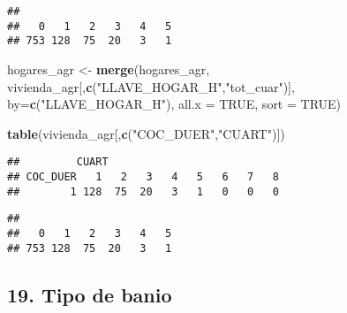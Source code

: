 \documentclass[11pt,]{article}
\newenvironment{Shaded}{\begin{snugshade}}{\end{snugshade}}
\newcommand{\KeywordTok}[1]{\textcolor[rgb]{0.13,0.29,0.53}{\textbf{#1}}}
\newcommand{\DataTypeTok}[1]{\textcolor[rgb]{0.13,0.29,0.53}{#1}}
\newcommand{\DecValTok}[1]{\textcolor[rgb]{0.00,0.00,0.81}{#1}}
\newcommand{\StringTok}[1]{\textcolor[rgb]{0.31,0.60,0.02}{#1}}
\newcommand{\CommentTok}[1]{\textcolor[rgb]{0.56,0.35,0.01}{\textit{#1}}}
\newcommand{\OtherTok}[1]{\textcolor[rgb]{0.56,0.35,0.01}{#1}}
\newcommand{\OperatorTok}[1]{\textcolor[rgb]{0.81,0.36,0.00}{\textbf{#1}}}
\newcommand{\NormalTok}[1]{#1}
\begin{document}
\begin{verbatim}
## 
##   0   1   2   3   4   5 
## 753 128  75  20   3   1
\end{verbatim}

\begin{Shaded}
\begin{Highlighting}[]
\NormalTok{hogares_agr <-}\StringTok{ }\KeywordTok{merge}\NormalTok{(hogares_agr,}
\NormalTok{                   vivienda_agr[,}\KeywordTok{c}\NormalTok{(}\StringTok{"LLAVE_HOGAR_H"}\NormalTok{,}\StringTok{"tot_cuar"}\NormalTok{)],}
                   \DataTypeTok{by=}\KeywordTok{c}\NormalTok{(}\StringTok{"LLAVE_HOGAR_H"}\NormalTok{),}
                   \DataTypeTok{all.x =} \OtherTok{TRUE}\NormalTok{,}
                   \DataTypeTok{sort =} \OtherTok{TRUE}\NormalTok{)}

\KeywordTok{table}\NormalTok{(vivienda_agr[,}\KeywordTok{c}\NormalTok{(}\StringTok{"COC_DUER"}\NormalTok{,}\StringTok{"CUART"}\NormalTok{)])}
\end{Highlighting}
\end{Shaded}

\begin{verbatim}
##         CUART
## COC_DUER   1   2   3   4   5   6   7   8
##        1 128  75  20   3   1   0   0   0
\end{verbatim}

\begin{Shaded}
\end{Shaded}

\begin{verbatim}
## 
##   0   1   2   3   4   5 
## 753 128  75  20   3   1
\end{verbatim}

\subsection{19. Tipo de banio}\label{tipo-de-banio}

\begin{Shaded}
\end{Shaded}
\end{document}
